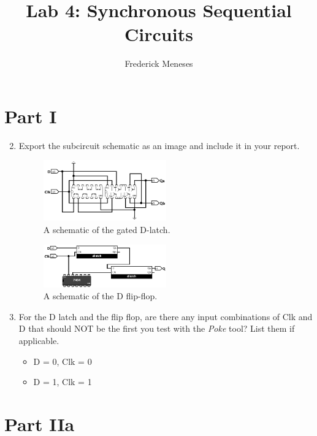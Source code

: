 \documentclass{article}
\title{Lab 4: Synchronous Sequential Circuits}
\author{Frederick Meneses}
\begin{document}
\maketitle

\section*{Part I}

\begin{enumerate}
\setcounter{enumi}{1}
\item Export the subcircuit schematic as an image and include it in your report.

\begin{figure}[ht!]
    \centering
    \includegraphics[width=0.5\textwidth]{lab4_gated D-latch.png}
    \caption{A schematic of the gated D-latch.}
    \label{gateddlatch}
\end{figure}


\begin{figure}[ht!]
    \centering
    \includegraphics[width=0.5\textwidth]{lab4_D flip flop.png}
    \caption{A schematic of the D flip-flop.}
    \label{dflipdlop}
\end{figure}


\item For the D latch and the flip flop, are there any input combinations of Clk and D that should NOT be the first you test with the \emph{Poke} tool? List them if applicable.
\begin{itemize}
	\item D = 0, Clk = 0
	\item D = 1, Clk = 1
\end{itemize}
\end{enumerate}
\section*{Part IIa}
\end{document}
